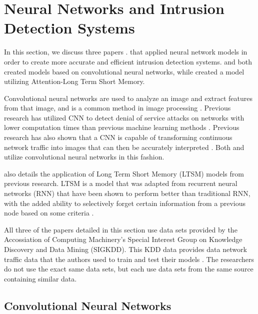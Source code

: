 \section{Neural Networks and Intrusion Detection Systems}


In this section, we discuss three papers .  that applied neural network models in order to create more accurate and efficient intrusion detection systems.  \cite{su19} and \cite{nguyen18} both created models based on convolutional neural networks, while \cite{yang20} created a model utilizing Attention-Long Term Short Memory. 

Convolutional neural networks are used to analyze an image and extract features from that image, and is a common method in image processing \cite{nguyen18}. Previous research has utilized CNN to detect denial of service attacks on networks with lower computation times than previous machine learning methods \cite{nguyen18}. Previous research has also shown that a CNN is capable of transforming continuous network traffic into images that can then be accurately interpreted \cite{su19}. Both \cite{su19} and \cite{nguyen18} utilize convolutional neural networks in this fashion. 

\cite{yang20} also details the application of Long Term Short Memory (LTSM) models from previous research. LTSM is a model that was adapted from recurrent neural networks (RNN) that have been shown to perform better than traditional RNN, with the added ability to selectively forget certain information from a previous node based on some criteria \cite{yang20}.

All three of the papers detailed in this section use data sets provided by the Accossiation of Computing Machinery’s Special Interest Group on Knowledge Discovery and Data Mining (SIGKDD). This KDD data provides data network traffic data that the authors used to train and test their models .  The researchers do not use the exact same data sets, but each use data sets from the same source containing similar data. 


\subsection{Convolutional Neural Networks}

